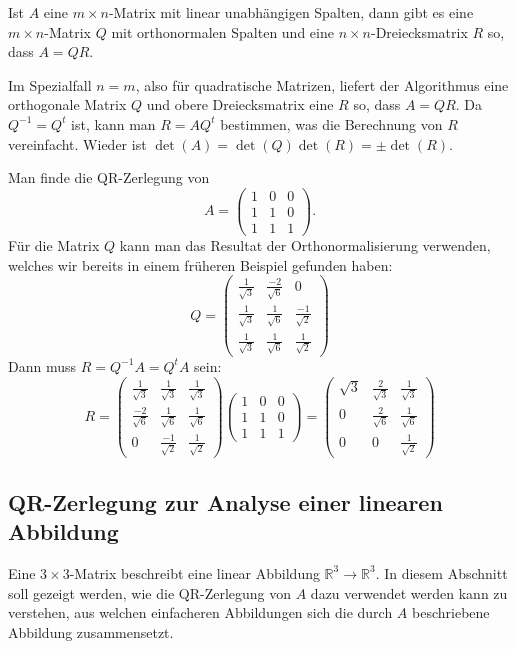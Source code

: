 \begin{satz}[QR-Zerlegung]
Ist $A$ eine $m\times n$-Matrix mit linear unabhängigen Spalten,
dann gibt es eine $m\times n$-Matrix $Q$ mit orthonormalen Spalten
und eine $n\times n$-Dreiecksmatrix $R$ so, dass $A=QR$.
\end{satz}

Im Spezialfall $n=m$, also für quadratische Matrizen, liefert der
Algorithmus eine orthogonale Matrix $Q$ und obere Dreiecksmatrix eine $R$
so, dass $A=QR$.
Da $Q^{-1}=Q^t$ ist, kann man $R=AQ^t$ bestimmen,
was die Berechnung von $R$ vereinfacht.
Wieder ist $\det(A)=\det(Q)\det(R)=\pm\det(R)$.

\begin{beispiel}
Man finde die QR-Zerlegung von 
\[
A=\begin{pmatrix}1&0&0\\1&1&0\\1&1&1\end{pmatrix}.
\]
Für die Matrix $Q$ kann man das Resultat der Orthonormalisierung
verwenden, welches wir bereits in einem früheren Beispiel gefunden
haben:
\[
Q=
\begin{pmatrix}
\frac1{\sqrt{3}}&\frac{-2}{\sqrt{6}}&0\\
\frac1{\sqrt{3}}&\frac{1}{\sqrt{6}}&\frac{-1}{\sqrt{2}}\\
\frac1{\sqrt{3}}&\frac{1}{\sqrt{6}}&\frac{1}{\sqrt{2}}
\end{pmatrix}
\]
Dann muss $R=Q^{-1}A=Q^tA$ sein:
\[
R=
\begin{pmatrix}
\frac1{\sqrt{3}}&\frac1{\sqrt{3}}&\frac1{\sqrt{3}}\\
\frac{-2}{\sqrt{6}}&\frac{1}{\sqrt{6}}&\frac{1}{\sqrt{6}}\\
0&\frac{-1}{\sqrt{2}}&\frac{1}{\sqrt{2}}
\end{pmatrix}
\begin{pmatrix}1&0&0\\1&1&0\\1&1&1\end{pmatrix}
=
\begin{pmatrix}
\sqrt{3}&\frac{2}{\sqrt{3}}&\frac{1}{\sqrt{3}}\\
0&\frac2{\sqrt{6}}&\frac1{\sqrt{6}}\\
0&0&\frac1{\sqrt{2}}
\end{pmatrix}
\]
\end{beispiel}

%
%
\subsection{QR-Zerlegung zur Analyse einer linearen Abbildung}
Eine $3\times 3$-Matrix beschreibt eine linear Abbildung
$\mathbb{R}^3\to\mathbb{R}^3$.
In diesem Abschnitt soll gezeigt werden, wie die QR-Zerlegung von $A$
dazu verwendet werden kann zu verstehen, aus welchen einfacheren
Abbildungen sich die durch $A$ beschriebene Abbildung zusammensetzt.

